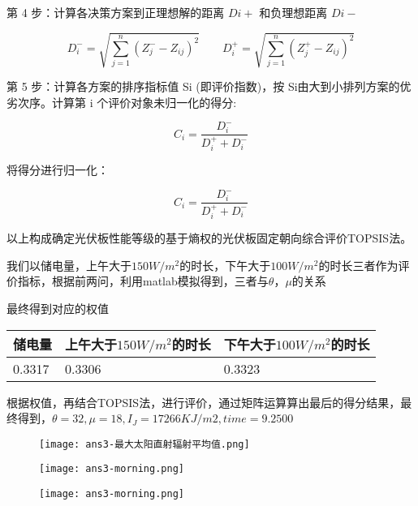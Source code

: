 \documentclass[withoutpreface,bwprint]{cumcmthesis} %
\begin{document}
第 4 步：计算各决策方案到正理想解的距离 $Di+$ 和负理想距离 $Di-$






\begin{equation}
	D_{i}^{-}=\sqrt{\sum_{j=1}^{n}(Z_{j}^{-}-Z_{ij})^2} \qquad D_{i}^{+}=\sqrt{\sum_{j=1}^{n}(Z_{j}^{+}-Z_{ij})^2}
	\label{eq:013}
\end{equation}



第 5 步：计算各方案的排序指标值 Si (即评价指数)，按 Si由大到小排列方案的优劣次序。计算第 i 个评价对象未归一化的得分:




\begin{equation}
	C_{i}=\frac{D_{i}^{-}}{D_{i}^{+}+D_{i}^{-}}
	\label{eq:013}
\end{equation}

将得分进行归一化：




\begin{equation}
	C_{i} = \frac{D_{i}^{-}}{D_{i}^{+} + D_{i}^{-}}
	\label{eq:013}
\end{equation}


以上构成确定光伏板性能等级的基于熵权的光伏板固定朝向综合评价TOPSIS法。

我们以储电量，上午大于$150W/m^2$的时长，下午大于$100W/m^2$的时长三者作为评价指标，根据前两问，利用matlab模拟得到，三者与$\theta$，$\mu$的关系

最终得到对应的权值
\begin{table}[!ht]
	\centering
	\begin{tabular}{|l|l|l|}
		\hline
		储电量 & 上午大于$150W/m^2$的时长 &  下午大于$100W/m^2$的时长 \\ \hline
		0.3317 & 0.3306 & 0.3323 \\ \hline
	\end{tabular}
\end{table}

根据权值，再结合TOPSIS法，进行评价，通过矩阵运算算出最后的得分结果，最终得到，$\theta = 32,\mu = 18,I_J = 17266 KJ/m2,time = 9.2500$
\begin{figure}
	\centering
	\begin{minipage}[c]{0.3\textwidth}
		\centering
		\texttt{[image: ans3-最大太阳直射辐射平均值.png]}
	\end{minipage}
	\begin{minipage}[c]{0.3\textwidth}
		\centering
		\texttt{[image: ans3-morning.png]}
	\end{minipage}
	\begin{minipage}[c]{0.3\textwidth}
		\centering
		\texttt{[image: ans3-morning.png]}
	\end{minipage}
\end{figure}
\end{document}

